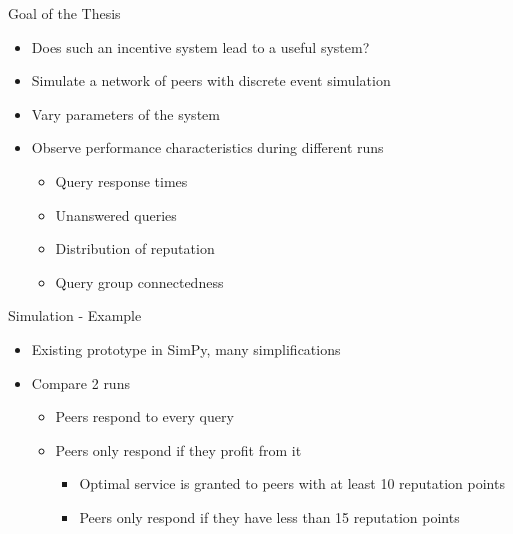 \documentclass[presentation,english,usenames,dvipsnames]{beamer}
\begin{document}
\begin{frame}{Goal of the Thesis}
  \begin{itemize}
    \item Does such an incentive system lead to a useful system?
    \item Simulate a network of peers with discrete event simulation
    \item Vary parameters of the system
    \item Observe performance characteristics during different runs
    \begin{itemize}
      \item Query response times
      \item Unanswered queries
      \item Distribution of reputation
      \item Query group connectedness
    \end{itemize}
  \end{itemize}
\end{frame}

\begin{frame}{Simulation - Example}
  \begin{itemize}
    \item Existing prototype in SimPy, many simplifications
    \item Compare 2 runs
    \begin{itemize}
      \item Peers respond to every query
      \item Peers only respond if they profit from it
      \begin{itemize}
        \item Optimal service is granted to peers with at least 10 reputation
              points
        \item Peers only respond if they have less than 15 reputation points
      \end{itemize}
    \end{itemize}
  \end{itemize}
\end{frame}
\end{document}
